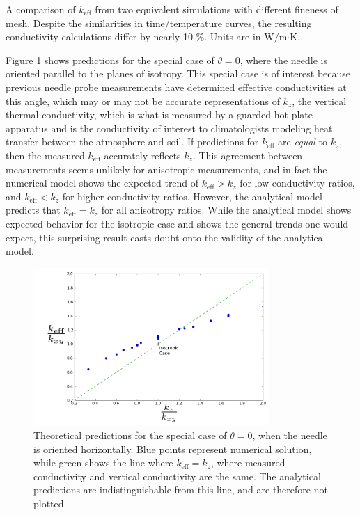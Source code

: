 \begin{table}[h]
\centering

\caption{A comparison of \(k_{\textrm{eff}}\) from two equivalent simulations 
with different fineness of mesh. Despite the similarities in time/temperature
curves, the resulting  conductivity calculations differ by nearly 10 \%. Units are in W\(/\)m\(\cdot\)K.}
\label{tab:conv_kvals}
\end{table}

Figure \ref{fig:angle0} shows predictions for the special case of
\(\theta = 0 \), where the needle is oriented parallel to the planes of isotropy.
This special case is of interest because previous needle probe measurements have
determined effective conductivities at this angle, which may or may not be
accurate representations of \(k_z\), the vertical thermal conductivity, which is
what is measured by a guarded hot plate apparatus and is the conductivity
of interest to climatologists modeling heat transfer between the atmosphere and
soil. If predictions for \(k_{\textrm{eff}}\) are \emph{equal} to \(k_z\), then
the measured \(k_{\textrm{eff}}\) accurately reflects \(k_z\). This agreement
between measurements seems unlikely for anisotropic measurements, and in fact 
the numerical model shows the expected trend of \(k_{\textrm{eff}} > k_z\) for
low conductivity ratios, and \(k_{\textrm{eff}} < k_z\) for higher conductivity
ratios. However, the analytical model predicts that \(k_{\textrm{eff}} = k_z\)
for all anisotropy ratios. While the analytical model shows expected behavior
for the isotropic case and shows the general trends one would expect, this
surprising result casts doubt onto the validity of the analytical model.

\begin{figure}[h]
\centering
\includegraphics[width=0.8\textwidth]{fig/angle_0.png}
\caption{Theoretical predictions for the special case of \(\theta = 0 \),
when the needle is oriented horizontally. Blue points represent numerical solution, while green shows the line where \(k_{\textrm{eff}} = k_z\), where measured conductivity and vertical conductivity are the same. The analytical predictions are indistinguishable from this line, and are therefore not plotted.}
\label{fig:angle0}
\end{figure}


